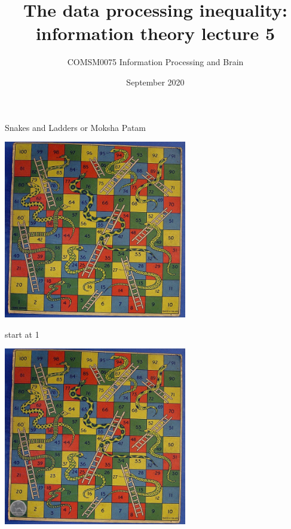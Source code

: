 \documentclass{beamer}
\title[Information Theory lecture 5]{The data processing inequality: information theory lecture 5}
\author{COMSM0075 Information Processing and Brain}
\institute{\texttt{comsm0075.github.io}}
\date{September 2020}
\begin{document}
\maketitle

\begin{frame}{Snakes and Ladders or Moksha Patam}
  \begin{center}
    \includegraphics[width=8cm]{game.png}
  \end{center}
    \vfill
\tiny{}
\end{frame}


\begin{frame}{start at 1}
  \begin{center}
    \includegraphics[width=8cm]{game1.jpg}
  \end{center}
    \vfill
\tiny{}
\end{frame}
\end{document}
